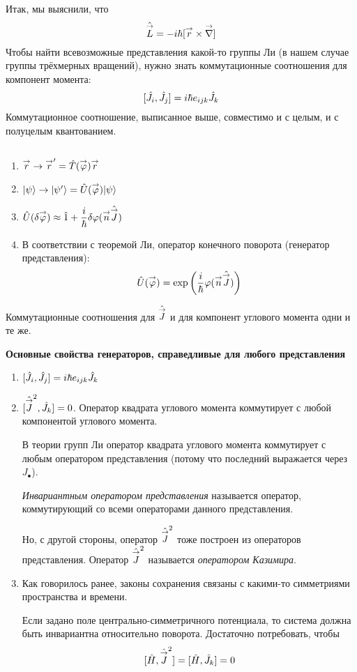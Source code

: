 Итак, мы выяснили, что
$$
    \Hat{\vec L} = -i \hbar [\vec r \times \vec \nla]
$$
Чтобы найти всевозможные представления какой-то группы Ли (в нашем случае группы трёхмерных вращений), нужно знать коммутационные соотношения для компонент момента:
$$
    [\Hat J_i, \Hat J_j] = i \hbar e_{ijk} \Hat J_k
$$
Коммутационное соотношение, выписанное выше, совместимо и с целым, и с полуцелым квантованием.

\subsection{}
\begin{enumerate}
  \item $\vec r \to \vec r' = \Hat T(\vec \phi) \vec r$
  \item $\qu \psi \to \qu{\psi'} = \Hat U(\vec \phi) \qu{\psi}$
  \item $\Hat U(\dta \vec \phi) \approx \Hat 1 + \dfrac{i}{\hbar} \dta \phi (\vec n \Hat{\vec J})$
  \item В соответствии с теоремой Ли, оператор конечного поворота (генератор представления):
  $$
    \Hat U (\vec \phi) = \exp\left(\dfrac{i}{\hbar} \phi(\vec n \Hat {\vec J})\right)
  $$
\end{enumerate}
Коммутационные соотношения для $\Hat{\vec J}$ и для компонент углового момента одни и те же.


\textbf{Основные свойства генераторов, справедливые для любого представления}
\begin{enumerate}
  \item $[\Hat{J_i}, \Hat{J_j}] = i \hbar e_{ijk} \Hat J_k$
  \item $[\Hat{\vec J}^2, \Hat J_k] = 0$. Оператор квадрата углового момента коммутирует с любой компонентой углового момента.
      
      В теории групп Ли оператор квадрата углового момента коммутирует с любым оператором представления (потому что последний выражается через $J_{\bullet}$).

\Def \emph{Инвариантным оператором представления} называется оператор, коммутирующий со всеми операторами данного представления.

\def \Jsq {\Hat{\vec J}^2}
Но, с другой стороны, оператор $\Hat{ \vec{J}}^2$ тоже построен из операторов представления. Оператор $\Jsq$ называется \emph{оператором Казимира}.

    \item Как говорилось ранее, законы сохранения связаны с какими-то симметриями пространства и времени. 
    
    Если задано поле центрально-симметричного потенциала, то система должна быть инвариантна относительно поворота. Достаточно потребовать, чтобы
    $$
        [\Hat H, \Jsq] = [\Hat H, \Hat J_k] = 0
    $$
\end{enumerate}
